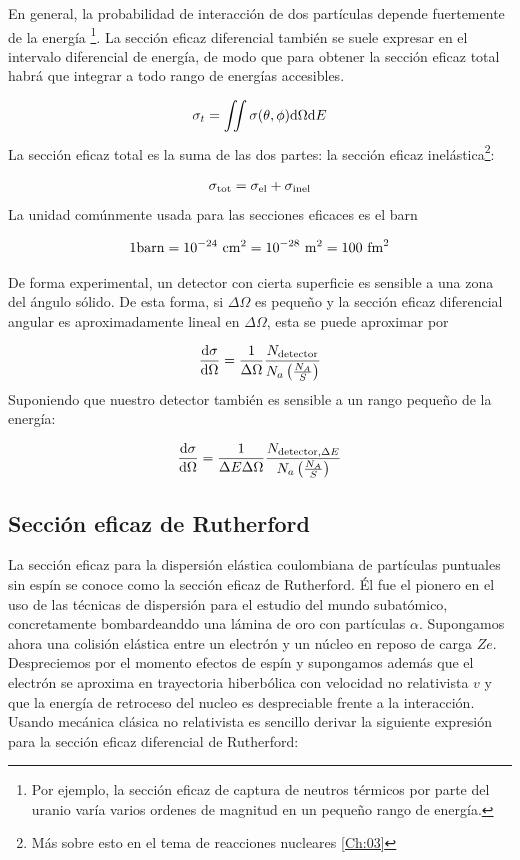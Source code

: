 En general, la probabilidad de interacción de dos partículas depende fuertemente de la energía \footnote{Por ejemplo, la sección eficaz de captura de neutros térmicos por parte del uranio varía varios ordenes de magnitud en un pequeño rango de energía.}. La sección eficaz diferencial también se suele expresar en el intervalo diferencial de energía, de modo que para obtener la sección eficaz total habrá que integrar a todo rango de energías accesibles.

\begin{equation}
	\sigma_t = \iint\sigma(\theta,\phi) \mathrm{d} \Omega \mathrm{d} E
\end{equation}
La sección eficaz total es la suma de las dos partes: la sección eficaz inelástica\footnote{Más sobre esto en el tema de reacciones nucleares \ref{Ch:03}}:

\begin{eqnarray}
	\sigma_{\text{tot}} = \sigma_{\text{el}}+ \sigma_{\text{inel}}
\end{eqnarray}
La unidad comúnmente usada para las secciones eficaces es el barn

\begin{eqnarray}
	1 \unit{barn} = 10^{-24} \ \unit{\cm^{2}} = 10^{-28} \  \unit{\m^2} = 100 \ \unit{\fm^2}
\end{eqnarray}

De forma experimental, un detector con cierta superficie es sensible a una zona del ángulo sólido. De esta forma, si $\Delta \Omega$ es pequeño y la sección eficaz diferencial angular es aproximadamente lineal en $\Delta \Omega$, esta se puede aproximar por 

\begin{equation}
	\frac{\mathrm{d} \sigma}{\mathrm{d} \Omega} = \frac{1}{\Delta \Omega} \frac{N_{\text{detector}}}{N_a \left( \frac{N_A}{S} \right)}
\end{equation}
Suponiendo que nuestro detector también es sensible a un rango pequeño de la energía:


\begin{equation}
	\frac{\mathrm{d} \sigma}{\mathrm{d} \Omega} = \frac{1}{\Delta E \Delta \Omega} \frac{N_{\text{detector},\Delta E}}{N_a \left( \frac{N_A}{S} \right)}
\end{equation}



\subsection{Sección eficaz de Rutherford}

La sección eficaz para la dispersión elástica coulombiana de partículas puntuales sin espín se conoce como la sección eficaz de Rutherford. Él fue el pionero en el uso de las técnicas de dispersión para el estudio del mundo subatómico, concretamente bombardeanddo una lámina de oro con partículas $\alpha$. Supongamos ahora una colisión elástica entre un electrón y un núcleo en reposo de carga $Ze$. Despreciemos por el momento efectos de espín y supongamos además que el electrón se aproxima en trayectoria hiberbólica con velocidad no relativista $v$ y que la energía de retroceso del nucleo es despreciable frente a la interacción. Usando mecánica clásica no relativista es sencillo derivar la siguiente expresión para la sección eficaz diferencial de Rutherford:

